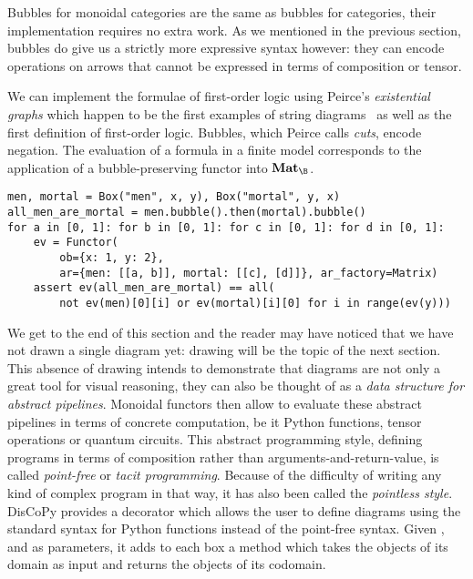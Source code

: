 Bubbles for monoidal categories are the same as bubbles for categories, their implementation requires no extra work.
As we mentioned in the previous section, bubbles do give us a strictly more expressive syntax however: they can encode operations on arrows that cannot be expressed in terms of composition or tensor.

\begin{example}
We can implement the formulae of first-order logic using Peirce's \emph{existential graphs} which happen to be the first examples of string diagrams~\cite{BradyTrimble98,BradyTrimble00,MelliesZeilberger16,HaydonSobocinski20} as well as the first definition of first-order logic.
Bubbles, which Peirce calls \emph{cuts}, encode negation.
The evaluation of a formula in a finite model corresponds to the application of a bubble-preserving functor into $\mathbf{Mat}_\B$.

\begin{verbatim}
men, mortal = Box("men", x, y), Box("mortal", y, x)
all_men_are_mortal = men.bubble().then(mortal).bubble()
for a in [0, 1]: for b in [0, 1]: for c in [0, 1]: for d in [0, 1]:
    ev = Functor(
        ob={x: 1, y: 2},
        ar={men: [[a, b]], mortal: [[c], [d]]}, ar_factory=Matrix)
    assert ev(all_men_are_mortal) == all(
        not ev(men)[0][i] or ev(mortal)[i][0] for i in range(ev(y)))
\end{verbatim}
\end{example}

We get to the end of this section and the reader may have noticed that we have not drawn a single diagram yet: drawing will be the topic of the next section.
This absence of drawing intends to demonstrate that diagrams are not only a great tool for visual reasoning, they can also be thought of as a \emph{data structure for abstract pipelines}.
Monoidal functors then allow to evaluate these abstract pipelines in terms of concrete computation, be it Python functions, tensor operations or quantum circuits.
This abstract programming style, defining programs in terms of composition rather than arguments-and-return-value, is called \emph{point-free} or \emph{tacit programming}.
Because of the difficulty of writing any kind of complex program in that way, it has also been called the \emph{pointless style}.
DisCoPy provides a  decorator which allows the user to define diagrams using the standard syntax for Python functions instead of the point-free syntax.
Given ,  and  as parameters, it adds to each box a  method which takes the objects of its domain as input and returns the objects of its codomain.

